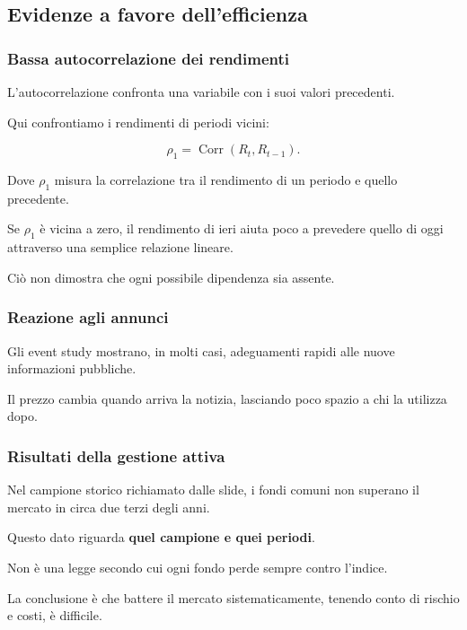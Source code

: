 \subsection{Evidenze a favore dell'efficienza}

\subsubsection*{Bassa autocorrelazione dei rendimenti}

\noindent L'autocorrelazione confronta
una variabile con i suoi valori precedenti.

\noindent Qui confrontiamo i rendimenti
di periodi vicini:

\[
\rho_1
=
\operatorname{Corr}(R_t,R_{t-1}).
\]

\noindent Dove $\rho_1$ misura
la correlazione tra il rendimento
di un periodo e quello precedente.

\medskip

\noindent Se $\rho_1$ è vicina a zero,
il rendimento di ieri aiuta poco
a prevedere quello di oggi
attraverso una semplice relazione lineare.

\noindent Ciò non dimostra che ogni possibile
dipendenza sia assente.


\subsubsection*{Reazione agli annunci}

\noindent Gli event study mostrano,
in molti casi, adeguamenti rapidi
alle nuove informazioni pubbliche.

\noindent Il prezzo cambia quando arriva
la notizia, lasciando poco spazio
a chi la utilizza dopo.


\subsubsection*{Risultati della gestione attiva}

\noindent Nel campione storico richiamato
dalle slide, i fondi comuni
non superano il mercato
in circa due terzi degli anni.

\noindent Questo dato riguarda
\textbf{quel campione e quei periodi}.

\noindent Non è una legge secondo cui
ogni fondo perde sempre contro l'indice.

\medskip

\noindent La conclusione è che battere
il mercato sistematicamente,
tenendo conto di rischio e costi,
è difficile.


